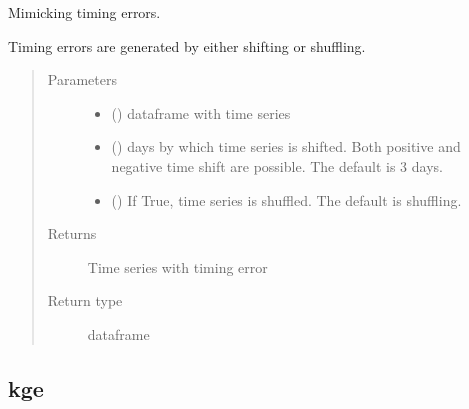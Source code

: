 \documentclass[letterpaper,10pt,english]{sphinxmanual}
\begin{document}
\begin{fulllineitems}
\label{\detokenize{reference/generate_errors:de.generate_errors.timing}}
Mimicking timing errors.

Timing errors are generated by either shifting or shuffling.
\begin{quote}\begin{description}
\item[{Parameters}] \leavevmode\begin{itemize}
\item {} 
 () \textendash{} dataframe with time series

\item {} 
 (\sphinxstyleliteralemphasis{\sphinxupquote{, }}) \textendash{} days by which time series is shifted. Both positive and negative
time shift are possible. The default is 3 days.

\item {} 
 (\sphinxstyleliteralemphasis{\sphinxupquote{, }}) \textendash{} If True, time series is shuffled. The default is shuffling.

\end{itemize}

\item[{Returns}] \leavevmode
{} \textendash{} Time series with timing error

\item[{Return type}] \leavevmode
dataframe

\end{description}\end{quote}

\end{fulllineitems}



\subsection{kge}
\label{\detokenize{reference/kge:kge}}\label{\detokenize{reference/kge::doc}}
\end{document}
